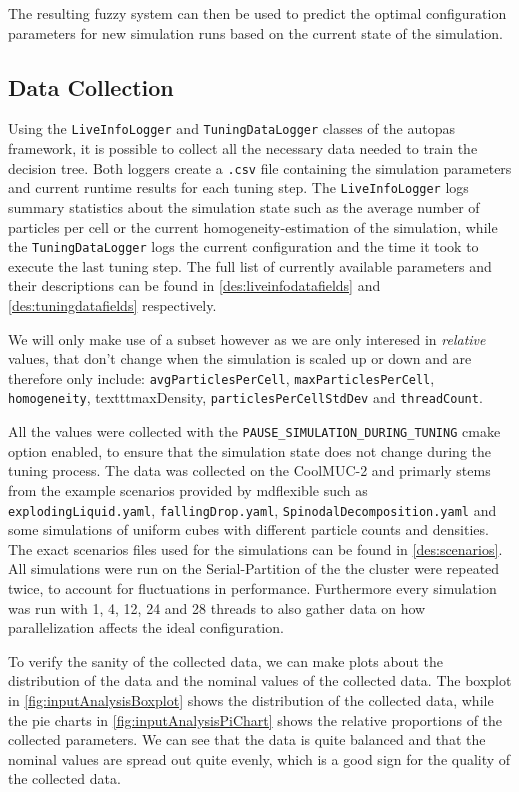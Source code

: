The resulting fuzzy system can then be used to predict the optimal configuration parameters for new simulation runs based on the current state of the simulation.

\subsection{Data Collection}

Using the \texttt{LiveInfoLogger} and \texttt{TuningDataLogger} classes of the \gls{autopas} framework, it is possible to collect all the necessary data needed to train the decision tree. Both loggers create a \texttt{.csv} file containing the simulation parameters and current runtime results for each tuning step. The \texttt{LiveInfoLogger} logs summary statistics about the simulation state such as the average number of particles per cell or the current homogeneity-estimation of the simulation, while the \texttt{TuningDataLogger} logs the current configuration and the time it took to execute the last tuning step. The full list of currently available parameters and their descriptions can be found in \autoref{des:liveinfodatafields} and \autoref{des:tuningdatafields} respectively.

We will only make use of a subset however as we are only interesed in \emph{relative} values, that don't change when the simulation is scaled up or down and are therefore only include:  \texttt{avgParticlesPerCell}, \texttt{maxParticlesPerCell}, \texttt{homogeneity}, texttt{maxDensity}, \texttt{particlesPerCellStdDev} and \texttt{threadCount}.

All the values were collected with the \texttt{PAUSE\_SIMULATION\_DURING\_TUNING} cmake option enabled, to ensure that the simulation state does not change during the tuning process. The data was collected on the CoolMUC-2  and primarly stems from the example scenarios provided by \gls{mdflexible} such as \texttt{explodingLiquid.yaml}, \texttt{fallingDrop.yaml}, \texttt{SpinodalDecomposition.yaml} and some simulations of uniform cubes with different particle counts and densities. The exact scenarios files used for the simulations can be found in \autoref{des:scenarios}.
All simulations were run on the Serial-Partition of the the cluster were repeated twice, to account for fluctuations in performance. Furthermore every simulation was run with 1, 4, 12, 24 and 28 threads to also gather data on how parallelization affects the ideal configuration.


To verify the sanity of the collected data, we can make plots about the distribution of the data and the nominal values of the collected data. The boxplot in \autoref{fig:inputAnalysisBoxplot} shows the distribution of the collected data, while the pie charts in \autoref{fig:inputAnalysisPiChart} shows the relative proportions of the collected parameters. We can see that the data is quite balanced and that the nominal values are spread out quite evenly, which is a good sign for the quality of the collected data.


